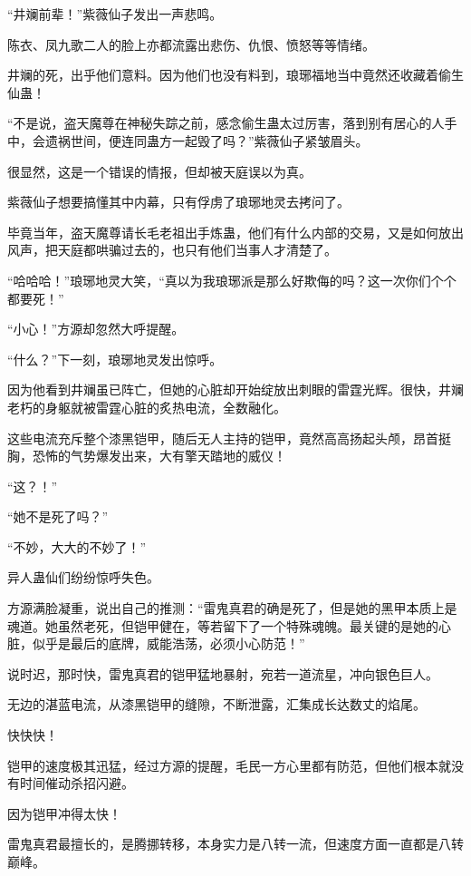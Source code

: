 
\begin{this_body}

“井斓前辈！”紫薇仙子发出一声悲鸣。

陈衣、凤九歌二人的脸上亦都流露出悲伤、仇恨、愤怒等等情绪。

井斓的死，出乎他们意料。因为他们也没有料到，琅琊福地当中竟然还收藏着偷生仙蛊！

“不是说，盗天魔尊在神秘失踪之前，感念偷生蛊太过厉害，落到别有居心的人手中，会遗祸世间，便连同蛊方一起毁了吗？”紫薇仙子紧皱眉头。

很显然，这是一个错误的情报，但却被天庭误以为真。

紫薇仙子想要搞懂其中内幕，只有俘虏了琅琊地灵去拷问了。

毕竟当年，盗天魔尊请长毛老祖出手炼蛊，他们有什么内部的交易，又是如何放出风声，把天庭都哄骗过去的，也只有他们当事人才清楚了。

“哈哈哈！”琅琊地灵大笑，“真以为我琅琊派是那么好欺侮的吗？这一次你们个个都要死！”

“小心！”方源却忽然大呼提醒。

“什么？”下一刻，琅琊地灵发出惊呼。

因为他看到井斓虽已阵亡，但她的心脏却开始绽放出刺眼的雷霆光辉。很快，井斓老朽的身躯就被雷霆心脏的炙热电流，全数融化。

这些电流充斥整个漆黑铠甲，随后无人主持的铠甲，竟然高高扬起头颅，昂首挺胸，恐怖的气势爆发出来，大有擎天踏地的威仪！

“这？！”

“她不是死了吗？”

“不妙，大大的不妙了！”

异人蛊仙们纷纷惊呼失色。

方源满脸凝重，说出自己的推测：“雷鬼真君的确是死了，但是她的黑甲本质上是魂道。她虽然老死，但铠甲健在，等若留下了一个特殊魂魄。最关键的是她的心脏，似乎是最后的底牌，威能浩荡，必须小心防范！”

说时迟，那时快，雷鬼真君的铠甲猛地暴射，宛若一道流星，冲向银色巨人。

无边的湛蓝电流，从漆黑铠甲的缝隙，不断泄露，汇集成长达数丈的焰尾。

快快快！

铠甲的速度极其迅猛，经过方源的提醒，毛民一方心里都有防范，但他们根本就没有时间催动杀招闪避。

因为铠甲冲得太快！

雷鬼真君最擅长的，是腾挪转移，本身实力是八转一流，但速度方面一直都是八转巅峰。


\end{this_body}
